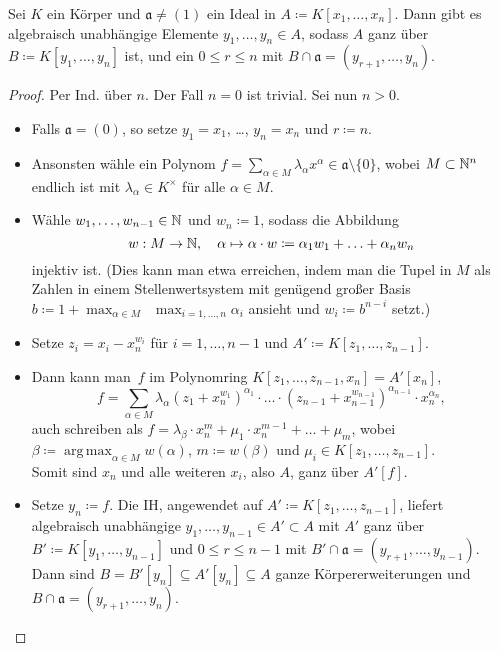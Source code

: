 \documentclass{cheat-sheet}
\DeclareMathOperator*{\argmax}{arg\,max}
\newcommand{\aaa}{\mathfrak{a}}
\begin{document}
\begin{prop}
  Sei $K$ ein Körper und $\aaa \neq (1)$ ein Ideal in $A \coloneqq K[x_1, \ldots, x_n]$.
  Dann gibt es algebraisch unabhängige Elemente $y_1, \ldots, y_n \in A$, sodass $A$ ganz über $B \coloneqq K[y_1, \ldots, y_n]$ ist, und ein $0 \leq r \leq n$ mit $B \cap \aaa = (y_{r+1}, \ldots, y_n)$.
\end{prop}

\begin{proof}
  Per Ind. über $n$. Der Fall $n=0$ ist trivial. Sei nun $n > 0$.
  \begin{itemize}
    \item Falls $\aaa = (0)$, so setze $y_1 = x_1$, \ldots, $y_n = x_n$ und $r \coloneqq n$.
    \item Ansonsten wähle ein Polynom $f = {\sum}_{\alpha \in M} \lambda_\alpha x^\alpha \in \aaa \setminus \{ 0 \}$, wobei $M \subset \mathbb{N}^n$ endlich ist mit $\lambda_\alpha \in K^{\times}$ für alle $\alpha \in M$.
    \item Wähle $w_1, \ldots, w_{n-1} \in \mathbb{N}$ und $w_n \coloneqq 1$, sodass die Abbildung
    \[
      w : M \to \mathbb{N}, \quad
      \alpha \mapsto \alpha \cdot w \coloneqq \alpha_1 w_1 + \ldots + \alpha_n w_n
    \]
    injektiv ist.
    (Dies kann man etwa erreichen, indem man die Tupel in $M$ als Zahlen in einem Stellenwertsystem mit genügend großer Basis $b \coloneqq 1 + \max_{\alpha \in M} \enspace \max_{i = 1, \ldots, n} \alpha_i$ ansieht und $w_i \coloneqq b^{n-i}$ setzt.)
    \item Setze $z_i = x_i - x_n^{w_i}$ für $i = 1, \ldots, n-1$ und $A' \coloneqq K[z_1, \ldots, z_{n-1}]$.
    \item Dann kann man~$f$ im Polynomring $K[z_1, \ldots, z_{n-1}, x_n] = A'[x_n]$,
    \[
      f = {\sum}_{\alpha \in M} \lambda_\alpha (z_1 + x_n^{w_1})^{\alpha_1} \cdot \ldots \cdot (z_{n-1} + x_{n-1}^{w_{n-1}})^{\alpha_{n-1}} \cdot x_n^{\alpha_n},
    \]
     auch schreiben als $f = \lambda_\beta \cdot x_n^{m} + \mu_1 \cdot x_n^{m - 1} + \ldots + \mu_{m}$, wobei $\beta \coloneqq {\argmax}_{\alpha \in M} w(\alpha)$, $m \coloneqq w(\beta)$ und $\mu_i \in K[z_1, \ldots, z_{n-1}]$. \\
     Somit sind $x_n$ und alle weiteren $x_i$, also $A$, ganz über $A'[f]$.
     \item Setze $y_n \coloneqq f$.
     Die IH, angewendet auf $A' \coloneqq K[z_1, \ldots, z_{n-1}]$, liefert algebraisch unabhängige $y_1, \ldots, y_{n-1} \in A' \subset A$ mit $A'$ ganz über $B' \coloneqq K[y_1, \ldots, y_{n-1}]$ und $0 \leq r \leq n-1$ mit $B' \cap \aaa = (y_{r+1}, \ldots, y_{n-1})$.
     Dann sind $B = B'[y_n] \subseteq A'[y_n] \subseteq A$ ganze Körpererweiterungen und $B \cap \aaa = (y_{r+1}, \ldots, y_n)$. \qedhere
  \end{itemize}
\end{proof}
\end{document}
